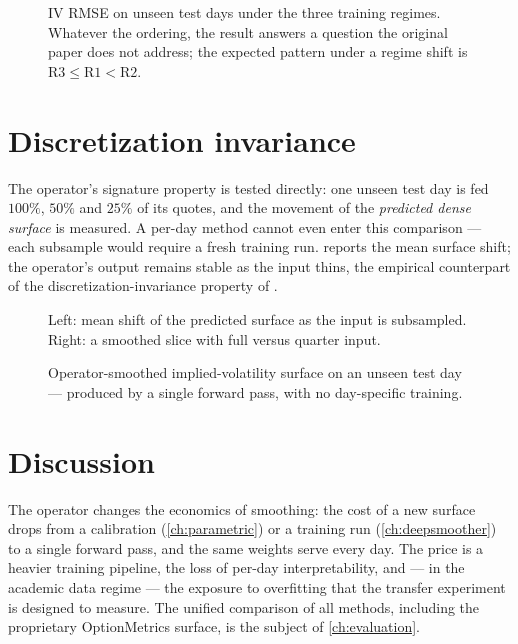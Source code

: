 \begin{figure}[t]
  \centering
  \caption[Transfer experiment R1/R2/R3]{IV RMSE on unseen test days under
  the three training regimes. Whatever the ordering, the result answers a
  question the original paper does not address; the expected pattern under a
  regime shift is $\mathrm{R3}\le\mathrm{R1}<\mathrm{R2}$.}
  \label{fig:transfer}
\end{figure}

\section{Discretization invariance}
\label{sec:invariance}

The operator's signature property is tested directly: one unseen test day is
fed $100\%$, $50\%$ and $25\%$ of its quotes, and the movement of the
\emph{predicted dense surface} is measured. A per-day method cannot even
enter this comparison --- each subsample would require a fresh training run.
 reports the mean surface shift; the operator's output
remains stable as the input thins, the empirical counterpart of the
discretization-invariance property of \cite{kovachki2023neural}.

\begin{figure}[t]
  \centering
  \caption[Discretization invariance]{Left: mean shift of the predicted
  surface as the input is subsampled. Right: a smoothed slice with full
  versus quarter input.}
  \label{fig:invariance}
\end{figure}

\begin{figure}[t]
  \centering
  \caption[Operator-smoothed surface on an unseen day]{Operator-smoothed
  implied-volatility surface on an unseen test day --- produced by a single
  forward pass, with no day-specific training.}
  \label{fig:opsurface}
\end{figure}

\section{Discussion}
The operator changes the economics of smoothing: the cost of a new surface
drops from a calibration (\cref{ch:parametric}) or a training run
(\cref{ch:deepsmoother}) to a single forward pass, and the same weights serve
every day. The price is a heavier training pipeline, the loss of per-day
interpretability, and --- in the academic data regime --- the exposure to
overfitting that the transfer experiment is designed to measure. The
unified comparison of all methods, including the proprietary OptionMetrics
surface, is the subject of \cref{ch:evaluation}.
